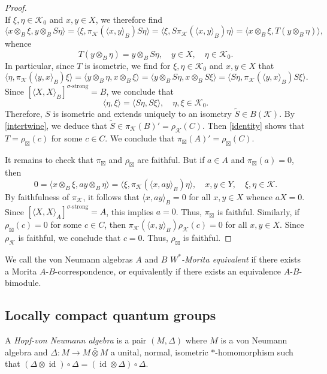 \documentclass[reqno]{amsart}
\numberwithin{equation}{section}
\DeclareMathOperator{\id}{\mathrm{id}}
\newcommand{\ovot}{\bar{\otimes}}
\begin{document}
\begin{proof}
\begin{equation}
\end{equation}
If $\xi, \eta \in \mathcal{K}_0$ and $x,y \in X$, we therefore find
$$\langle x \otimes_B\xi, y\otimes_B S \eta\rangle= \langle \xi, \pi_{\mathcal{K}}(\langle x,y\rangle_B)S\eta\rangle = \langle \xi, S \pi_{\mathcal{K}}(\langle x,y\rangle_B)\eta \rangle = \langle x \otimes_B \xi, T(y\otimes_B \eta)\rangle,$$
whence 
\begin{equation}\label{identity}
    T(y\otimes_B \eta) = y\otimes_B S \eta, \quad y \in X, \quad \eta \in \mathcal{K}_0.
\end{equation}
In particular, since $T$ is isometric, we find for $\xi, \eta \in \mathcal{K}_0$ and $x,y\in X$ that 
$$\langle \eta, \pi_{\mathcal{K}}(\langle y,x\rangle_B)\xi\rangle= \langle y\otimes_B \eta, x \otimes_B \xi\rangle = \langle y\otimes_B S\eta, x \otimes_B S\xi\rangle = \langle S\eta, \pi_{\mathcal{K}}(\langle y,x\rangle_B)S\xi\rangle.$$
Since $[\langle X,X\rangle_B]^{\sigma\text{-strong}}=B$, we conclude that 
$$\langle \eta, \xi\rangle = \langle S\eta, S\xi\rangle, \quad \eta, \xi \in \mathcal{K}_0.$$
Therefore, $S$ is isometric and extends uniquely to an isometry $\tilde{S}\in B(\mathcal{K}).$ By \eqref{intertwine}, we deduce that $\tilde{S}\in \pi_{\mathcal{K}}(B)'= \rho_\mathcal{K}(C)$. Then \eqref{identity}  shows that $T = \rho_\boxtimes(c)$ for some $c\in C$. We conclude that $\pi_{\boxtimes}(A)' = \rho_\boxtimes(C)$.

It remains to check that $\pi_{\boxtimes}$ and $\rho_{\boxtimes}$ are faithful. But if $a\in A$ and $\pi_{\boxtimes}(a) = 0$, then 
$$0 = \langle x\otimes_B \xi, ay\otimes_B \eta\rangle = \langle \xi, \pi_\mathcal{K}(\langle x,ay\rangle_B) \eta\rangle,\quad x,y \in Y, \quad \xi, \eta \in \mathcal{K}.$$
By faithfulness of $\pi_\mathcal{K}$, it follows that $\langle x,ay\rangle_B = 0$ for all $x, y \in X$ whence $aX = 0$. Since $[\langle X,X\rangle_A]^{\sigma\text{-strong}}=A$, this implies $a= 0$. Thus, $\pi_\boxtimes$ is faithful. Similarly, if $\rho_\boxtimes(c)= 0$ for some $c\in C$, then $\pi_\mathcal{K}(\langle x, y\rangle_B) \rho_\mathcal{K}(c)= 0$ for all $x,y \in X$. Since $\rho_\mathcal{K}$ is faithful, we conclude that $c = 0$. Thus, $\rho_\boxtimes$ is faithful.
\end{proof}

We call the von Neumann algebras $A$ and $B$ \emph{$W^*$-Morita equivalent} if there exists a Morita $A$-$B$-correspondence, or equivalently if there exists an equivalence $A$-$B$-bimodule. 

\subsection{Locally compact quantum groups}
A \emph{Hopf-von Neumann algebra} is a pair $(M, \Delta)$ where $M$ is a von Neumann algebra and $\Delta: M \to M \ovot M$ a unital, normal, isometric $*$-homomorphism such that $(\Delta \otimes \id)\circ \Delta = (\id \otimes \Delta)\circ \Delta$.
\end{document}

